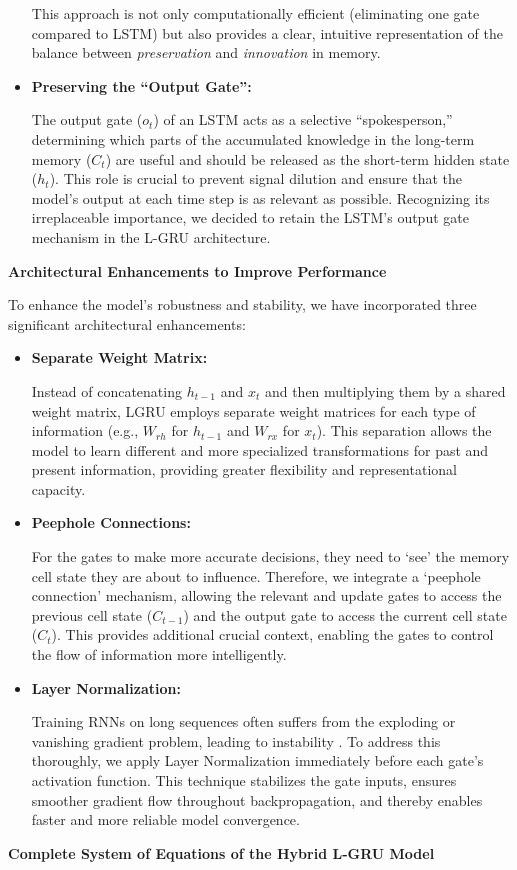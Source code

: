 \documentclass{cys}
\begin{document}
\begin{itemize}
    
This approach is not only computationally efficient (eliminating one gate compared 
to LSTM) but also provides a clear, intuitive representation of the balance between 
\emph{preservation} and \emph{innovation} in memory.
  \item \textbf{Preserving the “Output Gate”:}

  The output gate ($o_t$) of an LSTM acts as a selective ``spokesperson,'' determining which parts of the accumulated knowledge in the long-term memory ($C_t$) are useful and should be released as the short-term hidden state ($h_t$). This role is crucial to prevent signal dilution and ensure that the model's output at each time step is as relevant as possible. Recognizing its irreplaceable importance, we decided to retain the LSTM's output gate mechanism in the L-GRU architecture.
  
  \end{itemize}
  \item \textbf{Architectural Enhancements to Improve Performance}

  To enhance the model’s robustness and stability, we have incorporated three significant architectural enhancements:
  \begin{itemize}
      \item \textbf{Separate Weight Matrix:}

      Instead of concatenating $h_{t-1}$ and $x_t$ and then multiplying them by a shared weight matrix, L\textendash GRU employs separate weight matrices for each type of information (e.g., $W_{rh}$ for $h_{t-1}$ and $W_{rx}$ for $x_t$). This separation allows the model to learn different and more specialized transformations for past and present information, providing greater flexibility and representational capacity.
      \item \textbf{Peephole Connections:}

      For the gates to make more accurate decisions, they need to `see' the memory cell state they are about to influence. Therefore, we integrate a `peephole connection' mechanism, allowing the relevant and update gates to access the previous cell state ($C_{t-1}$) and the output gate to access the current cell state ($C_t$). This provides additional crucial context, enabling the gates to control the flow of information more intelligently.
      \item \textbf{Layer Normalization:}

      Training RNNs on long sequences often suffers from the exploding or vanishing gradient problem, leading to instability \cite{bengio1994learning}. To address this thoroughly, we apply Layer Normalization immediately before each gate’s activation function. This technique stabilizes the gate inputs, ensures smoother gradient flow throughout backpropagation, and thereby enables faster and more reliable model convergence.
  \end{itemize}
  \item \textbf{Complete System of Equations of the Hybrid L‑GRU Model}
\end{document}
